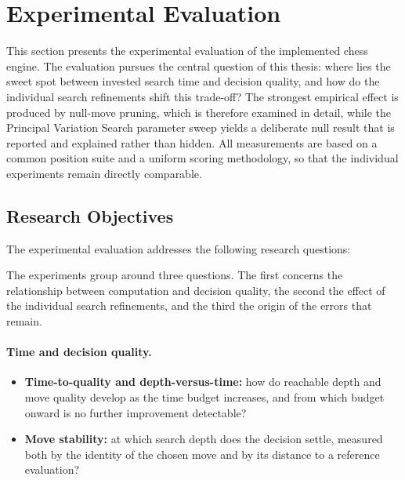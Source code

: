 \section{Experimental Evaluation}
\label{sec:evaluation}

This section presents the experimental evaluation of the implemented chess
engine. The evaluation pursues the central question of this thesis: where lies
the sweet spot between invested search time and decision quality, and how do the
individual search refinements shift this trade-off? The strongest empirical
effect is produced by null-move pruning, which is therefore examined in detail,
while the Principal Variation Search parameter sweep yields a deliberate null
result that is reported and explained rather than hidden. All measurements are
based on a common position suite and a uniform scoring methodology, so that the
individual experiments remain directly comparable.

\subsection{Research Objectives}
\label{subsec:research_objectives}

The experimental evaluation addresses the following research questions:

The experiments group around three questions. The first concerns the relationship
between computation and decision quality, the second the effect of the individual
search refinements, and the third the origin of the errors that remain.

\paragraph{Time and decision quality.}
\begin{itemize}
    \item \textbf{Time-to-quality and depth-versus-time:} how do reachable depth
    and move quality develop as the time budget increases, and from which budget
    onward is no further improvement detectable?
    \item \textbf{Move stability:} at which search depth does the decision settle,
    measured both by the identity of the chosen move and by its distance to a
    reference evaluation?
\end{itemize}

